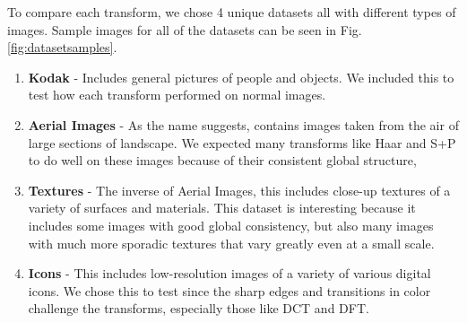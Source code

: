 
To compare each transform, we chose 4 unique datasets all with different types of images. Sample images for all of the datasets can be seen in Fig. \ref{fig:datasetsamples}.
\begin{enumerate}
    \item \textbf{Kodak} - Includes general pictures of people and objects. We included this to test how each transform performed on normal images.
    \item \textbf{Aerial Images} - As the name suggests, contains images taken from the air of large sections of landscape. We expected many transforms like Haar and S+P to do well on these images because of their consistent global structure, 
    \item \textbf{Textures} - The inverse of Aerial Images, this includes close-up textures of a variety of surfaces and materials. This dataset is interesting because it includes some images with good global consistency, but also many images with much more sporadic textures that vary greatly even at a small scale.
    \item \textbf{Icons} - This includes low-resolution images of a variety of various digital icons. We chose this to test since the sharp edges and transitions in color challenge the transforms, especially those like DCT and DFT.
\end{enumerate}

